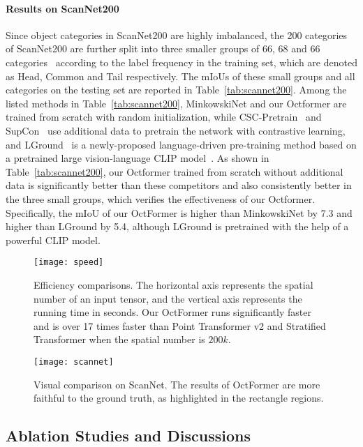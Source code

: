 \documentclass[acmtog,screen,authorversion]{acmart}
\begin{document}
\paragraph{Results on ScanNet200}
Since object categories in ScanNet200 are highly imbalanced, the 200 categories of ScanNet200 are further split into three smaller groups of 66, 68 and 66 categories~\cite{Rozen2022} according to the label frequency in the training set, which are denoted as Head, Common and Tail respectively.
The mIoUs of these small groups and all categories on the testing set are reported in Table~\ref{tab:scannet200}.
Among the listed methods in Table~\ref{tab:scannet200}, MinkowskiNet and our Octformer are trained from scratch with random initialization, while CSC-Pretrain~\cite{Hou2021} and SupCon~\cite{Khosla2020} use additional data to pretrain the network with contrastive learning, and LGround~\cite{Rozen2022} is a newly-proposed language-driven pre-training method based on a pretrained large vision-language CLIP model~\cite{Radford2021}.
As shown in Table~\ref{tab:scannet200}, our Octformer trained from scratch without additional data is significantly better than these competitors and also consistently better in the three small groups, which verifies the effectiveness of our Octformer.
Specifically, the mIoU of our OctFormer is higher than MinkowskiNet by 7.3 and higher than LGround by 5.4, although LGround is pretrained with the help of a powerful CLIP model.



\begin{figure}[t]
  \centering
  \texttt{[image: speed]}
  \caption{Efficiency comparisons. The horizontal axis represents the spatial number of an input tensor, and the vertical axis represents the running time in seconds.
  Our OctFormer runs significantly faster and is over 17 times faster than Point Transformer v2 and Stratified Transformer when the spatial number is $200k$.   }
  \label{fig:efficiency}
\end{figure}

\begin{figure}[t]
  \centering
  \texttt{[image: scannet]}
  \caption{Visual comparison on ScanNet. The results of OctFormer are more faithful to the ground truth, as highlighted in the rectangle regions.}
  \label{fig:scannet}
\end{figure}


\subsection{Ablation Studies and Discussions} \label{subsec:ablation}
\end{document}
